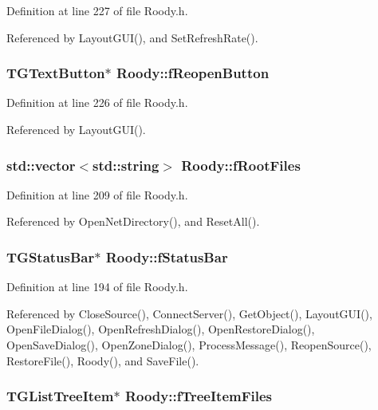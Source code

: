 Definition at line 227 of file Roody.h.

Referenced by LayoutGUI(), and SetRefreshRate().
\subsubsection[{fReopenButton}]{\setlength{\rightskip}{0pt plus 5cm}TGTextButton$\ast$ {\bf Roody::fReopenButton}\hspace{0.3cm}{\ttfamily  [private]}}\label{classRoody_add443a1d9618e0e979bb549ecba9ad22}


Definition at line 226 of file Roody.h.

Referenced by LayoutGUI().
\subsubsection[{fRootFiles}]{\setlength{\rightskip}{0pt plus 5cm}std::vector$<$std::string$>$ {\bf Roody::fRootFiles}\hspace{0.3cm}{\ttfamily  [private]}}\label{classRoody_a9550c2c6ac4c5099ac70b98d670e6031}


Definition at line 209 of file Roody.h.

Referenced by OpenNetDirectory(), and ResetAll().
\subsubsection[{fStatusBar}]{\setlength{\rightskip}{0pt plus 5cm}TGStatusBar$\ast$ {\bf Roody::fStatusBar}\hspace{0.3cm}{\ttfamily  [private]}}\label{classRoody_a92d8f0eb283ec9c065ce5a5cebe26d8e}


Definition at line 194 of file Roody.h.

Referenced by CloseSource(), ConnectServer(), GetObject(), LayoutGUI(), OpenFileDialog(), OpenRefreshDialog(), OpenRestoreDialog(), OpenSaveDialog(), OpenZoneDialog(), ProcessMessage(), ReopenSource(), RestoreFile(), Roody(), and SaveFile().
\subsubsection[{fTreeItemFiles}]{\setlength{\rightskip}{0pt plus 5cm}TGListTreeItem$\ast$ {\bf Roody::fTreeItemFiles}\hspace{0.3cm}{\ttfamily  [protected]}}\label{classRoody_a205b6f9dccb6bd42fb62bd00e5cc304d}


